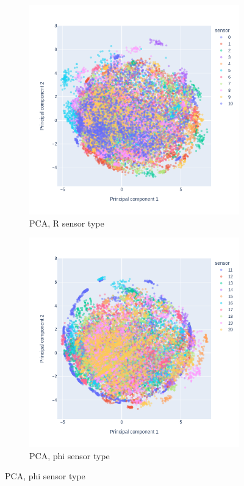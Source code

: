   \begin{figure}
\centering
\begin{subfigure}[b]{0.45\textwidth}
    \centering
    \includegraphics[width=\linewidth]{figures/chapter4/dimred/PCA_pedestals_r_phi_0.png}
\caption{PCA, R sensor type}
  \label{plot:PCA_pedestals_0}
  \end{subfigure}
\begin{subfigure}[b]{0.45\textwidth}
    \centering
    \includegraphics[width=\linewidth]{figures/chapter4/dimred/PCA_pedestals_r_phi_1.png}
\caption{PCA, phi sensor type}
   \label{plot:PCA_pedestals_1}
  \end{subfigure}



\end{figure}
